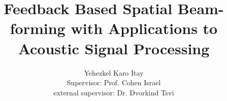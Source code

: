 \author{
Yehezkel Karo Itay\\[1cm]{Supervisor: Prof. Cohen Israel}\\{external supervisor: Dr. Dvorkind Tsvi}
}
\title{Feedback Based Spatial Beam-forming with Applications to Acoustic Signal Processing}